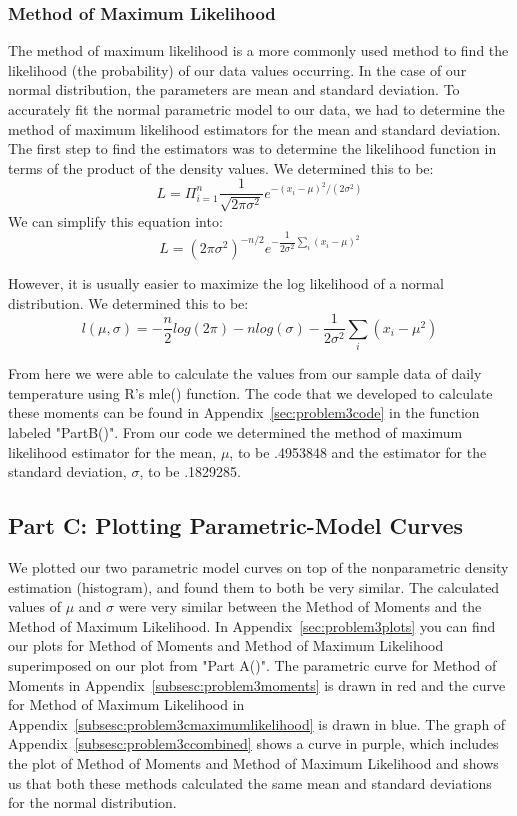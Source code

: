 \documentclass[11pt]{article}
\begin{document}
\subsubsection{Method of Maximum Likelihood}
\label{subsubsec:maximumlikelihood}
The method of maximum likelihood is a more commonly used method to find the likelihood (the probability) of our data values occurring. In the case of our normal distribution, the parameters are mean and standard deviation. To accurately fit the normal parametric model to our data, we had to determine the method of maximum likelihood estimators for the mean and standard deviation. The first step to find the estimators was to determine the likelihood function in terms of the product of the density values. We determined this to be:
\begin{equation}
L=\Pi_{i=1}^{n}\dfrac{1}{\sqrt{2\pi\sigma^2}}e^{-(x_i-\mu)^2/(2\sigma^2)}
\end{equation}
We can simplify this equation into:
\begin{equation}
L=(2\pi\sigma^2)^{-n/2}e^{-\dfrac{1}{2\sigma^2}\sum_{i}(x_i-\mu)^2}
\end{equation}

However, it is usually easier to maximize the log likelihood of a normal distribution. We determined this to be:
\begin{equation}
l(\mu,\sigma) = -\frac{n}{2}log(2\pi) - nlog(\sigma) - \frac{1}{2\sigma^{2}}\sum_{i}(x_i-\mu^2)
\end{equation} 

From here we were able to calculate the values from our sample data of daily temperature using R's mle() function. The code that we developed to calculate these moments can be found in Appendix~\ref{sec:problem3code} in the function labeled "PartB()". From our code we determined the method of maximum likelihood estimator for the mean, $\mu$, to be .4953848 and the estimator for the standard deviation, $\sigma$, to be .1829285. 


\subsection{Part C: Plotting Parametric-Model Curves}
\label{subsec:3c}
We plotted our two parametric model curves on top of the nonparametric density estimation (histogram), and found them to both be very similar. The calculated values of $\mu$ and $\sigma$ were very similar between the Method of Moments and the Method of Maximum Likelihood. In Appendix~\ref{sec:problem3plots} you can find our plots for Method of Moments and Method of Maximum Likelihood superimposed on our plot from "Part A()". The parametric curve for Method of Moments in Appendix~\ref{subsesc:problem3moments} is drawn in red and the curve for Method of Maximum Likelihood in Appendix~\ref{subsesc:problem3cmaximumlikelihood} is drawn in blue. The graph of Appendix~\ref{subsesc:problem3ccombined} shows a curve in purple, which includes the plot of Method of Moments and Method of Maximum Likelihood and shows us that both these methods calculated the same mean and standard deviations for the normal distribution.
\end{document}
